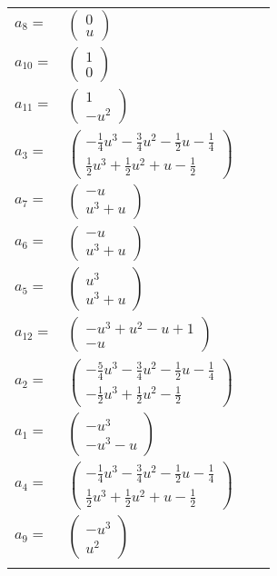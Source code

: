 \documentclass[1p]{elsarticle_modified}
\theoremstyle{definition}
\begin{document}
\begin{tabular}{m{7pt} m{180pt} m{7pt} m{180pt} }
\flushright $a_{8}=$&$\begin{pmatrix}0\\u\end{pmatrix}$ \\
\flushright $a_{10}=$&$\begin{pmatrix}1\\0\end{pmatrix}$ \\
\flushright $a_{11}=$&$\begin{pmatrix}1\\- u^2\end{pmatrix}$ \\
\flushright $a_{3}=$&$\begin{pmatrix}-\frac{1}{4} u^3-\frac{3}{4} u^2-\frac{1}{2} u-\frac{1}{4}\\\frac{1}{2} u^3+\frac{1}{2} u^2+u-\frac{1}{2}\end{pmatrix}$ \\
\flushright $a_{7}=$&$\begin{pmatrix}- u\\u^3+u\end{pmatrix}$ \\
\flushright $a_{6}=$&$\begin{pmatrix}- u\\u^3+u\end{pmatrix}$ \\
\flushright $a_{5}=$&$\begin{pmatrix}u^3\\u^3+u\end{pmatrix}$ \\
\flushright $a_{12}=$&$\begin{pmatrix}- u^3+u^2- u+1\\- u\end{pmatrix}$ \\
\flushright $a_{2}=$&$\begin{pmatrix}-\frac{5}{4} u^3-\frac{3}{4} u^2-\frac{1}{2} u-\frac{1}{4}\\-\frac{1}{2} u^3+\frac{1}{2} u^2-\frac{1}{2}\end{pmatrix}$ \\
\flushright $a_{1}=$&$\begin{pmatrix}- u^3\\- u^3- u\end{pmatrix}$ \\
\flushright $a_{4}=$&$\begin{pmatrix}-\frac{1}{4} u^3-\frac{3}{4} u^2-\frac{1}{2} u-\frac{1}{4}\\\frac{1}{2} u^3+\frac{1}{2} u^2+u-\frac{1}{2}\end{pmatrix}$ \\
\flushright $a_{9}=$&$\begin{pmatrix}- u^3\\u^2\end{pmatrix}$\\&\end{tabular}
\end{document}
